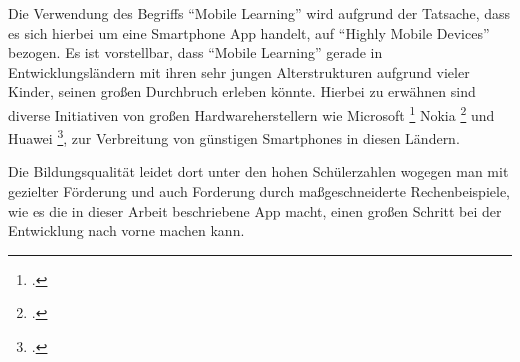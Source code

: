 Die Verwendung des Begriffs \enquote{Mobile Learning} wird aufgrund der Tatsache, dass es sich
hierbei um eine Smartphone App handelt, auf \enquote{Highly Mobile Devices} bezogen.
Es ist vorstellbar, dass \enquote{Mobile Learning} gerade in Entwicklungsländern mit ihren sehr
jungen Alterstrukturen aufgrund vieler Kinder, seinen großen Durchbruch erleben könnte. Hierbei zu
erwähnen sind diverse Initiativen von großen Hardwareherstellern wie Microsoft \footcite{http://www.epo.de/index.php?option=com_content&view=article&id=1809:microsoft-will-smartphone-fuer-entwicklungslaender-herstellen&catid=20:it-a-entwicklung&Itemid=51}
Nokia \footcite{http://www.n24.de/n24/Nachrichten/Netzwelt/d/1471900/nokia-setzt-auf-entwicklungslaender.html} und Huawei \footcite{http://ht4u.net/news/27090_huawei_bringt_windows_phone_4afrika_-_smartphone_fuer_entwicklungslaender/},  
zur Verbreitung von günstigen Smartphones in diesen Ländern.

Die Bildungsqualität leidet dort unter den hohen Schülerzahlen wogegen man mit gezielter Förderung
und auch Forderung durch maßgeschneiderte Rechenbeispiele, wie es die in dieser Arbeit beschriebene
App macht, einen großen Schritt bei der Entwicklung nach vorne machen kann.






